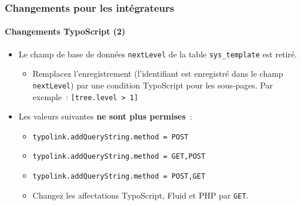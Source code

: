 
\begin{frame}[fragile]
	\frametitle{Changements pour les intégrateurs}
	\framesubtitle{Changements TypoScript (2)}

	\begin{itemize}
		\item Le champ de base de données \texttt{nextLevel} de la table
			\texttt{sys\_template} est retiré.

			\begin{itemize}\smaller
				\item[\ding{228}] Remplacez l'enregistrement (l'identifiant est enregistré dans le champ
					\texttt{nextLevel}) par une condition TypoScript pour les sous-pages.
					Par exemple~: \texttt{[tree.level > 1]}
			\end{itemize}\normalsize

		\item Les valeurs suivantes \textbf{ne sont plus permises}~:

			\begin{itemize}\smaller
				\item \texttt{typolink.addQueryString.method = POST}
				\item \texttt{typolink.addQueryString.method = GET,POST}
				\item \texttt{typolink.addQueryString.method = POST,GET}
			\end{itemize}\normalsize

			\begin{itemize}\smaller
				\item[\ding{228}] Changez les affectations TypoScript, Fluid et PHP par \texttt{GET}.
			\end{itemize}\normalsize

	\end{itemize}

\end{frame}


